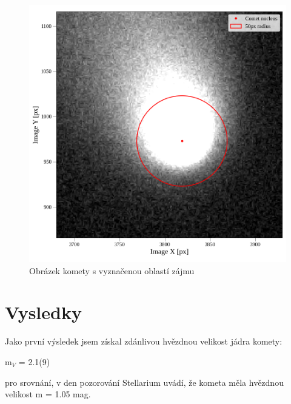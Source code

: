 \documentclass[a4paper,11pt]{article}
\begin{document}
    \begin{minipage}[t]{0.5\textwidth}
            \vspace{-30pt}   
            \begin{figure}[H]
                \centering
                \includegraphics[scale=0.35]{comet_clean}
                \captionsetup{justification=centering, font=footnotesize}
                \caption{Obrázek komety s vyznačenou oblastí zájmu}
                \label{fig:comet_clean}
            \end{figure}

        \section{Vysledky}
            Jako první výsledek jsem získal zdánlivou hvězdnou velikost jádra komety: 
            \begin{center}
                m$_V$ = 2.1(9)
            \end{center}
            \par pro srovnání, v den pozorování Stellarium uvádí, že kometa měla hvězdnou velikost m = 1.05 mag.
        
    \end{minipage}
\newpage
\end{document}
